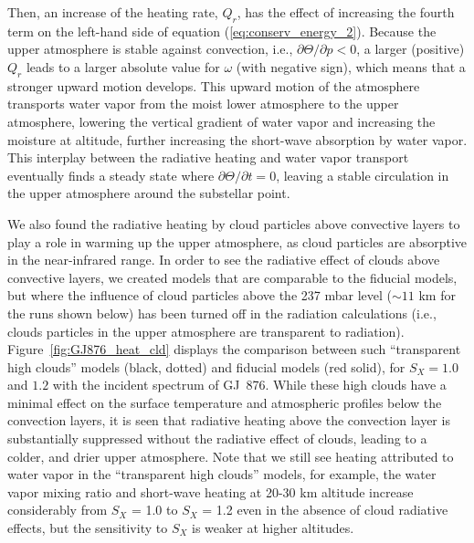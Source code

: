 \documentclass[11pt,numberedappendix,twocolappendix,]{emulateapj}
\def\wv{water vapor}
\newcommand{\yf}[1]{{\color{orange}#1}}
\begin{document}
Then, an increase of the heating rate, $Q_r$, has the effect of increasing the fourth term on the left-hand side of equation (\ref{eq:conserv_energy_2}). 
Because the upper atmosphere is stable against convection, i.e., $\partial \Theta / \partial p < 0 $, a larger (positive) $Q_r$ leads to a larger absolute value for $\omega $ (with negative sign), which means that a stronger upward motion develops. 
This upward motion of the atmosphere transports water vapor from the moist lower atmosphere to the upper atmosphere, lowering the vertical gradient of water vapor and increasing the moisture at altitude, further increasing the short-wave absorption by \wv{}. 
This interplay between the radiative heating and water vapor transport eventually finds a steady state where $\partial \Theta/\partial t = 0$, leaving a stable circulation in the upper atmosphere around the substellar point. 

We also found the radiative heating by cloud particles above convective layers to play a role in warming up the upper atmosphere, as cloud particles are absorptive in the near-infrared range. 
In order to see the radiative effect of clouds above convective layers, we created models that are comparable to the fiducial models, but where the  influence of cloud particles above the 237 mbar level ($\sim 11$ km for the runs shown below) has been turned off in the radiation calculations (i.e., clouds particles in the upper atmosphere are transparent to radiation). 
Figure~\ref{fig:GJ876_heat_cld} displays the comparison between such ``transparent high clouds'' models (black, dotted) and fiducial models (red solid), for $S_X=1.0$ and $1.2$ with the incident spectrum of GJ~876. 
While these high clouds have a minimal effect on the surface temperature and atmospheric profiles below the convection layers, it is seen that radiative heating above the convection layer is substantially suppressed without the radiative effect of clouds, leading to a colder, and drier upper atmosphere. 
Note that we still see heating attributed to water vapor in the ``transparent high clouds'' models, for example, the \wv{} mixing ratio \yf{and short-wave heating at 20-30 km altitude increase considerably from $S_X$ = 1.0 to $S_X$ = 1.2 even in the absence of cloud radiative effects, but the sensitivity to $S_X$ is weaker at higher altitudes. }
\end{document}

